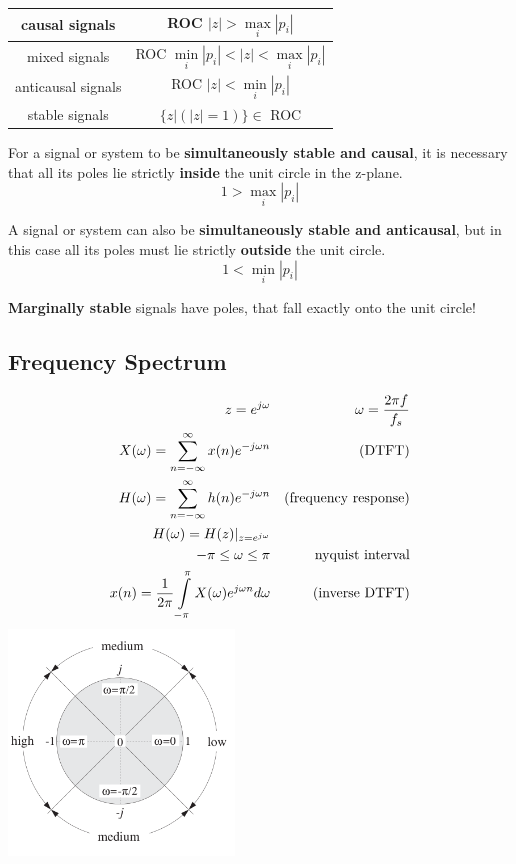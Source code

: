 \begin{center}
\begin{tabular}{|c|c|}
	\hline
	causal signals
		& ROC $|z| > \max\limits_{i}|p_i|$\\
	\hline
	mixed signals
		& ROC $\min\limits_{i}|p_i| < |z| < \max\limits_{i}|p_i|$ \\
	\hline
	anticausal signals
		& ROC $|z| < \min\limits_{i}|p_i|$\\
	\hline
	stable signals
		& $\{z\Big|(|z| = 1)\} \in$ ROC\\
	\hline
\end{tabular}
\end{center}


For a signal or system to be \textbf{simultaneously stable and causal}, it is necessary that all its poles lie strictly 
\textbf{inside} the unit circle in the z-plane. 
\[ 1 > \max\limits_{i}|p_i| \]

A signal or system
can also be \textbf{simultaneously stable and anticausal}, but in this case all its poles must lie
strictly \textbf{outside} the unit circle.
\[ 1 < \min\limits_{i}|p_i| \]

\textbf{Marginally stable} signals have poles, that fall exactly onto the unit circle!


\subsection{Frequency Spectrum}
\begin{multicols}{2}
	\begin{align}
	z=e^{j\omega} && \omega = \frac{2 \pi f}{f_s} \notag\\
	X(\omega)= \sum\limits_{n=-\infty}^{\infty} x(n)e^{-j\omega n} &&  \text{(DTFT)} \notag \\
	H(\omega)= \sum\limits_{n=-\infty}^{\infty} h(n)e^{-j\omega n} &&  \text{(frequency response)} \notag \\
	H(\omega)= H(z)|_{z=e^{j\omega}} \notag \\
	 -\pi \leq \omega \leq \pi && \text{nyquist interval}\notag\\
	x(n)= \frac{1}{2\pi} \int\limits_{-\pi}^{\pi} X(\omega)e^{j\omega n} d\omega &&\text{(inverse DTFT)} \notag
	\end{align}
\columnbreak
  \includegraphics[width=6cm]{./picture/freq_spect}
\end{multicols}

